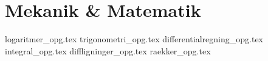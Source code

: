 \documentclass[crop=false, class=memoir]{standalone}
\begin{document}
\chapter{Mekanik \& Matematik} \label{chap:mat_opg}

{logaritmer_opg.tex}
{trigonometri_opg.tex}
{differentialregning_opg.tex}
{integral_opg.tex}
{diffligninger_opg.tex}
{raekker_opg.tex}
\end{document}
